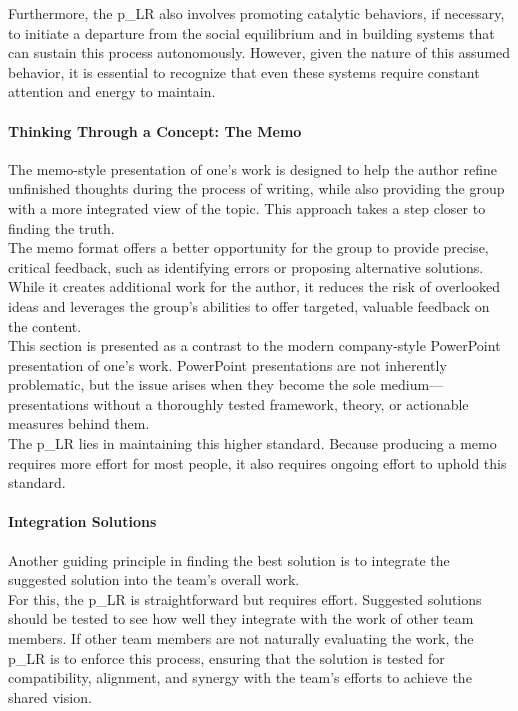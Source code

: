 Furthermore, the \gls{p_LR} also involves promoting catalytic behaviors, if necessary, to initiate a departure from the social equilibrium and in building systems that can sustain this process autonomously. However, given the nature of this assumed behavior, it is essential to recognize that even these systems require constant attention and energy to maintain.

\paragraph{Thinking Through a Concept: The Memo}

The memo-style presentation of one’s work is designed to help the author refine unfinished thoughts during the process of writing, while also providing the group with a more integrated view of the topic. This approach takes a step closer to finding the truth.\\

The memo format offers a better opportunity for the group to provide precise, critical feedback, such as identifying errors or proposing alternative solutions. While it creates additional work for the author, it reduces the risk of overlooked ideas and leverages the group's abilities to offer targeted, valuable feedback on the content.\\

This section is presented as a contrast to the modern company-style PowerPoint presentation of one’s work. PowerPoint presentations are not inherently problematic, but the issue arises when they become the sole medium—presentations without a thoroughly tested framework, theory, or actionable measures behind them.\\

The \gls{p_LR} lies in maintaining this higher standard. Because producing a memo requires more effort for most people, it also requires ongoing effort to uphold this standard. 

\paragraph{Integration Solutions}

Another guiding principle in finding the best solution is to integrate the suggested solution into the team's overall work.\\

For this, the \gls{p_LR} is straightforward but requires effort. Suggested solutions should be tested to see how well they integrate with the work of other team members. If other team members are not naturally evaluating the work, the \gls{p_LR} is to enforce this process, ensuring that the solution is tested for compatibility, alignment, and synergy with the team's efforts to achieve the shared vision. 

